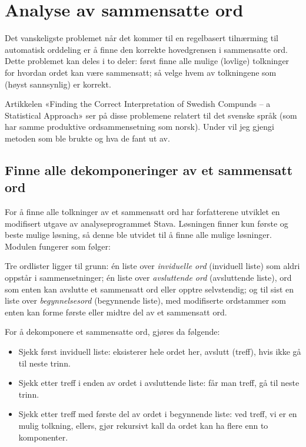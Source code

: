 \section{Analyse av sammensatte ord}
\label{sec:sammensatt-analyse}

Det vanskeligste problemet når det kommer til en regelbasert tilnærming til automatisk orddeling er å finne den korrekte hovedgrensen i sammensatte ord. Dette problemet kan deles i to deler: først finne alle mulige (lovlige) tolkninger for hvordan ordet kan være sammensatt; så velge hvem av tolkningene som (høyst sannsynlig) er korrekt.

 Artikkelen «Finding the Correct Interpretation of Swedish Compunds – a Statistical Approach» \cite{sjobergh2004finding} ser på disse problemene relatert til det svenske språk (som har samme produktive ordsammensetning som norsk). Under vil jeg gjengi metoden som ble brukte og hva de fant ut av.

\subsection{Finne alle dekomponeringer av et sammensatt ord}

For å finne alle tolkninger av et sammensatt ord har forfatterene utviklet en modifisert utgave av analyseprogrammet Stava. Løsningen finner kun første og beste mulige løsning, så denne ble utvidet til å finne alle mulige løsninger. Modulen fungerer som følger: 

Tre ordlister ligger til grunn: én liste over \textit{inviduelle ord} (inviduell liste) som aldri oppstår i sammensetninger; én liste over \textit{avsluttende ord} (avsluttende liste), ord som enten kan avslutte et sammensatt ord eller opptre selvstendig; og til sist en liste over \textit{begynnelsesord} (begynnende liste), med modifiserte ordstammer som enten kan forme første eller midtre del av et sammensatt ord.

For å dekomponere et sammensatte ord, gjøres da følgende:

\begin{itemize}
\item Sjekk først inviduell liste: eksisterer hele ordet her, avslutt (treff), hvis ikke gå til neste trinn.
\item Sjekk etter treff i enden av ordet i avsluttende liste: får man treff, gå til neste trinn.
\item Sjekk etter treff med første del av ordet i begynnende liste: ved treff, vi er en mulig tolkning, ellers, gjør rekursivt kall da ordet kan ha flere enn to komponenter. 
\end{itemize}

